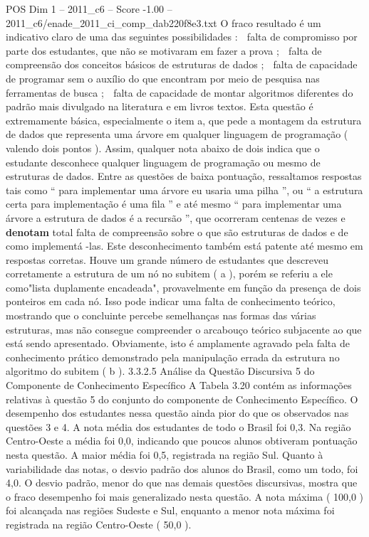 \begin{textsample}{POS Dim 1 – 2011\_c6 – Score -1.00 – 2011\_c6/enade\_2011\_ci\_comp\_dab220f8e3.txt}
O fraco resultado é um indicativo claro de uma das seguintes possibilidades :  falta de compromisso por parte dos estudantes, que não se motivaram em fazer a prova ;  falta de compreensão dos conceitos básicos de estruturas de dados ;  falta de capacidade de programar sem o auxílio do que encontram por meio de pesquisa nas ferramentas de busca ;  falta de capacidade de montar algoritmos diferentes do padrão mais divulgado na literatura e em livros textos.
Esta questão é extremamente básica, especialmente o item a, que pede a montagem da estrutura de dados que representa uma árvore em qualquer linguagem de programação ( valendo dois pontos ).
Assim, qualquer nota abaixo de dois indica que o estudante desconhece qualquer linguagem de programação ou mesmo de estruturas de dados.
Entre as questões de baixa pontuação, ressaltamos respostas tais como “ para implementar uma árvore eu usaria uma pilha ”, ou “ a estrutura certa para implementação é uma fila ” e até mesmo “ para implementar uma árvore a estrutura de dados é a recursão ”, que ocorreram centenas de vezes e \textbf{denotam} total falta de compreensão sobre o que são estruturas de dados e de como implementá -las.
Este desconhecimento também está patente até mesmo em respostas corretas.
Houve um grande número de estudantes que descreveu corretamente a estrutura de um nó no subitem ( a ), porém se referiu a ele como"lista duplamente encadeada", provavelmente em função da presença de dois ponteiros em cada nó.
Isso pode indicar uma falta de conhecimento teórico, mostrando que o concluinte percebe semelhanças nas formas das várias estruturas, mas não consegue compreender o arcabouço teórico subjacente ao que está sendo apresentado.
Obviamente, isto é amplamente agravado pela falta de conhecimento prático demonstrado pela manipulação errada da estrutura no algoritmo do subitem ( b ). 3.3.2.5 Análise da Questão Discursiva 5 do Componente de Conhecimento Específico A Tabela 3.20 contém as informações relativas à questão 5 do conjunto do componente de Conhecimento Específico.
O desempenho dos estudantes nessa questão ainda pior do que os observados nas questões 3 e 4.
A nota média dos estudantes de todo o Brasil foi 0,3.
Na região Centro-Oeste a média foi 0,0, indicando que poucos alunos obtiveram pontuação nesta questão.
A maior média foi 0,5, registrada na região Sul.
Quanto à variabilidade das notas, o desvio padrão dos alunos do Brasil, como um todo, foi 4,0.
O desvio padrão, menor do que nas demais questões discursivas, mostra que o fraco desempenho foi mais generalizado nesta questão.
A nota máxima ( 100,0 ) foi alcançada nas regiões Sudeste e Sul, enquanto a menor nota máxima foi registrada na região Centro-Oeste ( 50,0 ).

\end{textsample}
